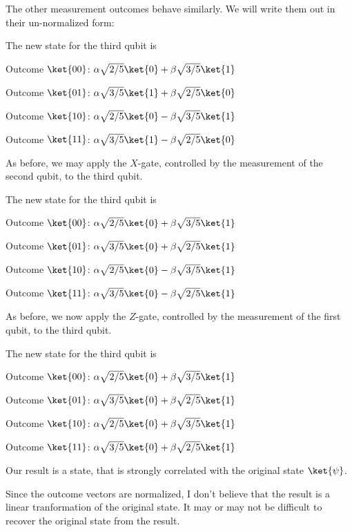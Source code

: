 \documentclass{article}
\begin{document}
\begin{enumerate}
        The other measurement outcomes behave similarly. We will write them out in their un-normalized form:

        The new state for the third qubit is

        Outcome $\ket{00}$: $\alpha\sqrt{2/5}\ket{0}+\beta\sqrt{3/5}\ket{1}$

        Outcome $\ket{01}$: $\alpha\sqrt{3/5}\ket{1}+\beta\sqrt{2/5}\ket{0}$

        Outcome $\ket{10}$: $\alpha\sqrt{2/5}\ket{0}-\beta\sqrt{3/5}\ket{1}$

        Outcome $\ket{11}$: $\alpha\sqrt{3/5}\ket{1}-\beta\sqrt{2/5}\ket{0}$

        As before, we may apply the $X$-gate, controlled by the measurement of the second qubit, to the third qubit.

        The new state for the third qubit is

        Outcome $\ket{00}$: $\alpha\sqrt{2/5}\ket{0}+\beta\sqrt{3/5}\ket{1}$

        Outcome $\ket{01}$: $\alpha\sqrt{3/5}\ket{0}+\beta\sqrt{2/5}\ket{1}$

        Outcome $\ket{10}$: $\alpha\sqrt{2/5}\ket{0}-\beta\sqrt{3/5}\ket{1}$

        Outcome $\ket{11}$: $\alpha\sqrt{3/5}\ket{0}-\beta\sqrt{2/5}\ket{1}$

        As before, we now apply the $Z$-gate, controlled by the measurement of the first qubit, to the third qubit.

        The new state for the third qubit is

        Outcome $\ket{00}$: $\alpha\sqrt{2/5}\ket{0}+\beta\sqrt{3/5}\ket{1}$

        Outcome $\ket{01}$: $\alpha\sqrt{3/5}\ket{0}+\beta\sqrt{2/5}\ket{1}$

        Outcome $\ket{10}$: $\alpha\sqrt{2/5}\ket{0}+\beta\sqrt{3/5}\ket{1}$

        Outcome $\ket{11}$: $\alpha\sqrt{3/5}\ket{0}+\beta\sqrt{2/5}\ket{1}$

        Our result is a state, that is strongly correlated with the original state $\ket{\psi}$.

        Since the outcome vectors are normalized, I don't believe that the result is a linear tranformation
        of the original state. It may or may not be difficult to recover the original state from the result.
\end{enumerate}
\end{document}
